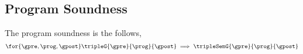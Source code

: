 \subsection{Program Soundness}
\begin{thm}
The program soundness is the follows,
\[
    \for{\gpre, \prog, \gpost}
    \tripleG{\gpre}{\prog}{\gpost} 
    \implies 
    \tripleSemG{\gpre}{\prog}{\gpost} 
\]
\end{thm}
